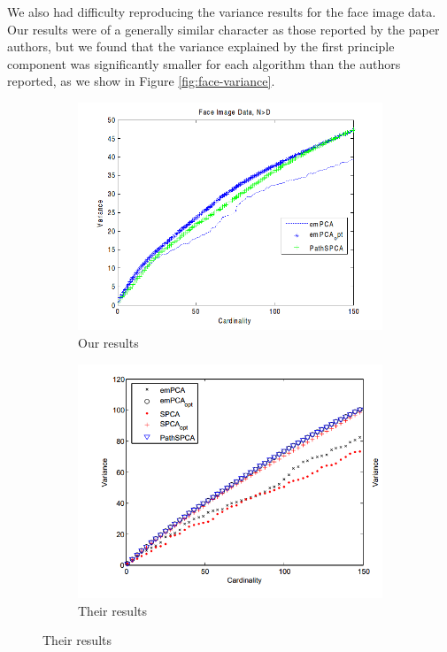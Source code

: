 \documentclass{article}
\begin{document}
We also had difficulty reproducing the variance results for the
face image data. Our results were of a generally similar character
as those reported by the paper authors, but we found that the variance
explained by the first principle component was significantly smaller
for each algorithm than the authors reported, as we show
in Figure \ref{fig:face-variance}.

\begin{figure}[H,width=\textwidth]
\caption{Variance versus cardinality for face data}
\label{fig:face-variance}
\begin{subfigure}{0.5\textwidth}
\caption{Our results}
\includegraphics[width=\textwidth]{4.png}
\end{subfigure}
\begin{subfigure}{0.5\textwidth}
\caption{Their results}
\includegraphics[width=\textwidth]{3.png}
\end{subfigure}
\end{figure}
\end{document}
